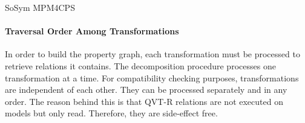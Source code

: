 \begin{copiedFrom}{SoSym MPM4CPS}


\paragraph{Traversal Order Among Transformations}
In order to build the property graph, each transformation must be processed to retrieve relations it contains. The decomposition procedure processes one transformation at a time. For compatibility checking purposes, transformations are independent of each other. They can be processed separately and in any order. The reason behind this is that QVT-R relations are not executed on models but only read. Therefore, they are side-effect free.


\end{copiedFrom}
